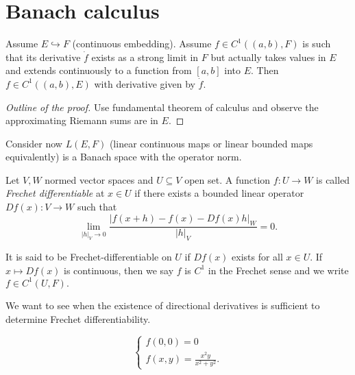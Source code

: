 \section{Banach calculus}

\begin{proposition}
    Assume $E \hookrightarrow F$ (continuous embedding). Assume $f \in C^1((a,b), F)$ is such that its derivative $\dot{f}$ exists as a strong limit in $F$ but actually takes values in $E$ and extends continuously to a function from $[a,b]$ into $E$. Then $f \in C^1((a,b), E)$ with derivative given by $\dot{f}.$
\end{proposition}
\begin{proof}[Outline of the proof]
    Use fundamental theorem of calculus and observe the approximating Riemann sums are in $E$.
\end{proof}

Consider now $L(E,F)$ (linear continuous maps or linear bounded maps equivalently) is a Banach space with the operator norm.

\begin{definition}
    Let $V, W$ normed vector spaces and $U \subseteq V$ open set. 
    A function $f:U \rightarrow W$ is called \textit{Frechet differentiable} at $x \in U$ if there exists a
    bounded linear operator $Df(x): V \rightarrow W$ such that
    \begin{equation}
        \lim_{|h|_V \rightarrow 0} \frac{|f(x + h) - f(x) - Df(x) h|_W}{|h|_V} = 0.
    \end{equation}

    It is said to be Frechet-differentiable on $U$ if $Df(x)$ exists for all $x \in U.$
    If $x \mapsto Df(x)$ is continuous, then we say $f$ is $C^1$ in the Frechet sense and we write $f \in C^1(U,F).$
\end{definition}

We want to see when the existence of directional derivatives is sufficient to determine Frechet differentiability.

\begin{example}
    \begin{equation}
        \begin{cases}
            f(0,0) = 0 \\
            f(x,y) = \frac{x^2 y}{x^2 + y^2}. 
        \end{cases}
    \end{equation}
\end{example}

